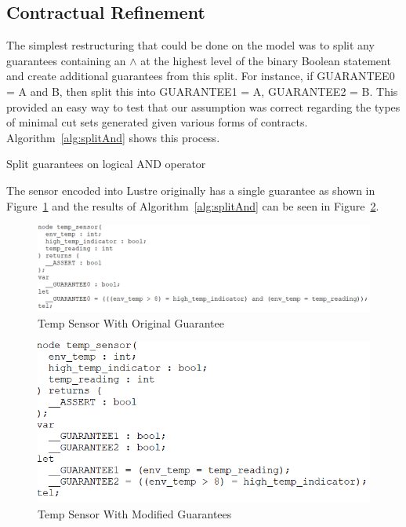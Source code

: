 \subsection{Contractual Refinement}
The simplest restructuring that could be done on the model was to split any guarantees containing an $\land$ at the highest level of the binary Boolean statement and create additional guarantees from this split. For instance, if GUARANTEE0 = A and B, then split this into GUARANTEE1 = A, GUARANTEE2 = B. This provided an easy way to test that our assumption was correct regarding the types of minimal cut sets generated given various forms of contracts. Algorithm~\ref{alg:splitAnd} shows this process. 

\begin{algorithm}[h]

	\caption{Split guarantees on logical AND operator}
	\label{alg:splitAnd}
\end{algorithm}

The sensor encoded into Lustre originally has a single guarantee as shown in Figure~\ref{fig:lustreOneGuar} and the results of Algorithm~\ref{alg:splitAnd} can be seen in Figure~\ref{fig:lustreTwoGuar}. 

\begin{figure}[h!]
\begin{center}
\includegraphics[width=1.0\textwidth]{images/lustreTwoGuar.PNG}
\caption{Temp Sensor With Original Guarantee} \label{fig:lustreOneGuar}
\end{center}
\end{figure} 

\begin{figure}[h!]
\begin{center}
\includegraphics[width=.8\textwidth]{images/lustreOneGuar.PNG}
\caption{Temp Sensor With Modified Guarantees} \label{fig:lustreTwoGuar}
\end{center}
\end{figure} 

